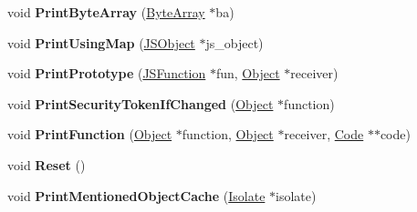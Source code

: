 \begin{DoxyCompactItemize}
\item 
\hypertarget{classv8_1_1internal_1_1_v8___f_i_n_a_l_a3b948d3b8fb2695e6cb4b159d863a046}{}void {\bfseries Print\+Byte\+Array} (\hyperlink{classv8_1_1internal_1_1_byte_array}{Byte\+Array} $\ast$ba)\label{classv8_1_1internal_1_1_v8___f_i_n_a_l_a3b948d3b8fb2695e6cb4b159d863a046}

\item 
\hypertarget{classv8_1_1internal_1_1_v8___f_i_n_a_l_ae0c2e5380855343ecd69ae9800c2abde}{}void {\bfseries Print\+Using\+Map} (\hyperlink{classv8_1_1internal_1_1_j_s_object}{J\+S\+Object} $\ast$js\+\_\+object)\label{classv8_1_1internal_1_1_v8___f_i_n_a_l_ae0c2e5380855343ecd69ae9800c2abde}

\item 
\hypertarget{classv8_1_1internal_1_1_v8___f_i_n_a_l_a7553f591f1de624748cd4e05b002b054}{}void {\bfseries Print\+Prototype} (\hyperlink{classv8_1_1internal_1_1_j_s_function}{J\+S\+Function} $\ast$fun, \hyperlink{classv8_1_1internal_1_1_object}{Object} $\ast$receiver)\label{classv8_1_1internal_1_1_v8___f_i_n_a_l_a7553f591f1de624748cd4e05b002b054}

\item 
\hypertarget{classv8_1_1internal_1_1_v8___f_i_n_a_l_a5d5fc6b80488784afc13c92505ad9ab7}{}void {\bfseries Print\+Security\+Token\+If\+Changed} (\hyperlink{classv8_1_1internal_1_1_object}{Object} $\ast$function)\label{classv8_1_1internal_1_1_v8___f_i_n_a_l_a5d5fc6b80488784afc13c92505ad9ab7}

\item 
\hypertarget{classv8_1_1internal_1_1_v8___f_i_n_a_l_a4d7bfbc334bddc9f3ec44b983f830088}{}void {\bfseries Print\+Function} (\hyperlink{classv8_1_1internal_1_1_object}{Object} $\ast$function, \hyperlink{classv8_1_1internal_1_1_object}{Object} $\ast$receiver, \hyperlink{classv8_1_1internal_1_1_code}{Code} $\ast$$\ast$code)\label{classv8_1_1internal_1_1_v8___f_i_n_a_l_a4d7bfbc334bddc9f3ec44b983f830088}

\item 
\hypertarget{classv8_1_1internal_1_1_v8___f_i_n_a_l_a17f9561526c0904c41aaf09b318d3da1}{}void {\bfseries Reset} ()\label{classv8_1_1internal_1_1_v8___f_i_n_a_l_a17f9561526c0904c41aaf09b318d3da1}

\item 
\hypertarget{classv8_1_1internal_1_1_v8___f_i_n_a_l_add6c35a4e302fdf49fd20a9f67f63a90}{}void {\bfseries Print\+Mentioned\+Object\+Cache} (\hyperlink{classv8_1_1internal_1_1_isolate}{Isolate} $\ast$isolate)\label{classv8_1_1internal_1_1_v8___f_i_n_a_l_add6c35a4e302fdf49fd20a9f67f63a90}


\end{DoxyCompactItemize}
